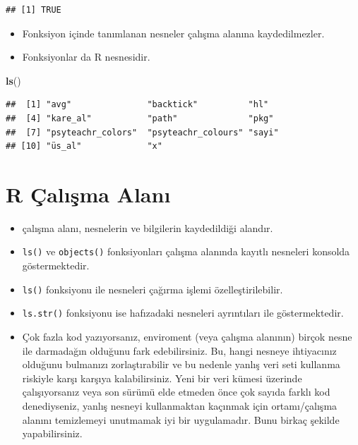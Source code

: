 \documentclass[
  oneside]{book}
\newenvironment{Shaded}{\begin{snugshade}}{\end{snugshade}}
\newcommand{\FunctionTok}[1]{\textcolor[rgb]{0.13,0.29,0.53}{\textbf{#1}}}
\newcommand{\NormalTok}[1]{#1}
\begin{document}
\begin{verbatim}
## [1] TRUE
\end{verbatim}

\begin{itemize}
\item
  Fonksiyon içinde tanımlanan nesneler çalışma alanına kaydedilmezler.
\item
  Fonksiyonlar da R nesnesidir.
\end{itemize}

\begin{Shaded}
\begin{Highlighting}[]
\FunctionTok{ls}\NormalTok{()}
\end{Highlighting}
\end{Shaded}

\begin{verbatim}
##  [1] "avg"               "backtick"          "hl"               
##  [4] "kare_al"           "path"              "pkg"              
##  [7] "psyteachr_colors"  "psyteachr_colours" "sayi"             
## [10] "üs_al"             "x"
\end{verbatim}

\hypertarget{r-uxe7alux131ux15fma-alanux131}{%
\section{R Çalışma Alanı}\label{r-uxe7alux131ux15fma-alanux131}}

\begin{itemize}
\item
  çalışma alanı, nesnelerin ve bilgilerin kaydedildiği alandır.
\item
  \texttt{ls()} ve \texttt{objects()} fonksiyonları çalışma alanında kayıtlı nesneleri konsolda göstermektedir.
\item
  \texttt{ls()} fonksiyonu ile nesneleri çağırma işlemi özelleştirilebilir.
\item
  \texttt{ls.str()} fonksiyonu ise hafızadaki nesneleri ayrıntıları ile göstermektedir.
\item
  Çok fazla kod yazıyorsanız, enviroment (veya çalışma alanının) birçok nesne ile darmadağın olduğunu fark edebilirsiniz. Bu, hangi nesneye ihtiyacınız olduğunu bulmanızı zorlaştırabilir ve bu nedenle yanlış veri seti kullanma riskiyle karşı karşıya kalabilirsiniz. Yeni bir veri kümesi üzerinde çalışıyorsanız veya son sürümü elde etmeden önce çok sayıda farklı kod denediyseniz, yanlış nesneyi kullanmaktan kaçınmak için ortamı/çalışma alanını temizlemeyi unutmamak iyi bir uygulamadır. Bunu birkaç şekilde yapabilirsiniz.
\end{itemize}
\end{document}
